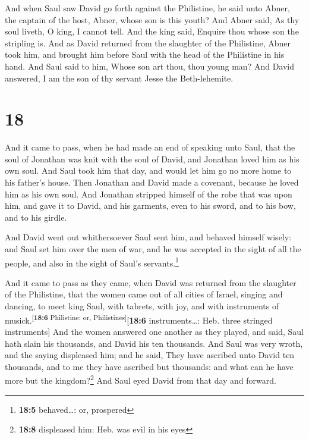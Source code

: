  And when Saul saw David go forth against the Philistine,
he said unto Abner, the captain of the host, Abner, whose son is this
youth? And Abner said, As thy soul liveth, O king, I cannot tell.
 And the king said, Enquire thou whose son the stripling
is.  And as David returned from the slaughter of the
Philistine, Abner took him, and brought him before Saul with the head of
the Philistine in his hand.  And Saul said to him, Whose
son art thou, thou young man? And David answered, I am the son of thy
servant Jesse the Beth-lehemite.

\hypertarget{section-17}{%
\section{18}\label{section-17}}

 And it came to pass, when he had made an end of speaking
unto Saul, that the soul of Jonathan was knit with the soul of David,
and Jonathan loved him as his own soul.  And Saul took him
that day, and would let him go no more home to his father's house.
 Then Jonathan and David made a covenant, because he loved
him as his own soul.  And Jonathan stripped himself of the
robe that was upon him, and gave it to David, and his garments, even to
his sword, and to his bow, and to his girdle.

 And David went out whithersoever Saul sent him, and
behaved himself wisely: and Saul set him over the men of war, and he was
accepted in the sight of all the people, and also in the sight of Saul's
servants.\footnote{\textbf{18:5} behaved\ldots: or, prospered}

 And it came to pass as they came, when David was returned
from the slaughter of the Philistine, that the women came out of all
cities of Israel, singing and dancing, to meet king Saul, with tabrets,
with joy, and with instruments of
musick.\textsuperscript{{[}\textbf{18:6} Philistine: or,
Philistines{]}}{[}\textbf{18:6} instruments\ldots: Heb. three stringed
instruments{]}  And the women answered one another as they
played, and said, Saul hath slain his thousands, and David his ten
thousands.  And Saul was very wroth, and the saying
displeased him; and he said, They have ascribed unto David ten
thousands, and to me they have ascribed but thousands: and what can he
have more but the kingdom?\footnote{\textbf{18:8} displeased him: Heb.
  was evil in his eyes}  And Saul eyed David from that day
and forward.

